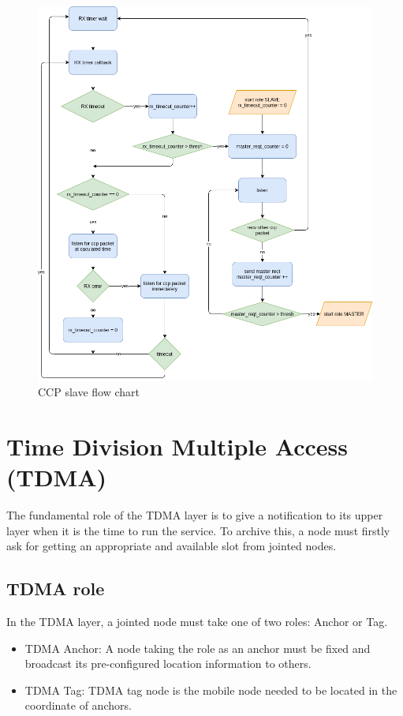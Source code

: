 \documentclass[../../main.tex]{subfiles}
\begin{document}
\begin{figure}[H]
    \begin{center}
        \includegraphics[scale=0.5]{ccp_slave_flow_chart.png}
    \end{center}
    \caption{CCP slave flow chart}
    \label{fig:ccp_slave_flow_chart}
\end{figure}

\section{Time Division Multiple Access (TDMA)}
The fundamental role of the TDMA layer is to give a notification to its upper layer when it is the time to run the service. To archive this, a node must firstly ask for getting an appropriate and available slot from jointed nodes.

\subsection{TDMA role}
In the TDMA layer, a jointed node must take one of two roles: Anchor or Tag.
\begin{itemize}
    \item TDMA Anchor: A node taking the role as an anchor must be fixed and broadcast its pre-configured location information to others.
    \item TDMA Tag: TDMA tag node is the mobile node needed to be located in the coordinate of anchors.
\end{itemize}
\end{document}
